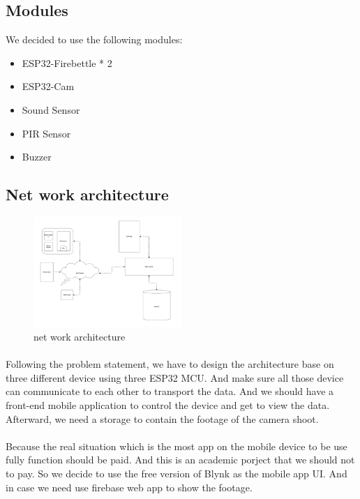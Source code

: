 \documentclass[a4paper, 12pt]{article}        %
\begin{document}
    \subsection{Modules}\label{subsec:modules}

    We decided to use the following modules:

    \begin{itemize}
        \item ESP32-Firebettle * 2
        \item ESP32-Cam
        \item Sound Sensor
        \item PIR Sensor
        \item Buzzer
    \end{itemize}

    \subsection{Net work architecture}\label{subsec:net-work-architecture}

    \begin{figure}[h]
        \centering
        \includegraphics[width=0.5\textwidth]{CircuitLayOut/img}
        \caption{net work architecture}
        \label{fig:figure1}
    \end{figure}

    \paragraph{}
    Following the problem statement, we have to design the architecture base on three different device using three ESP32 MCU\@.
    And make sure all those device can communicate to each other to transport the data.
    And we should have a front-end mobile application to control the device and get to view the data.
    Afterward, we need a storage to contain the footage of the camera shoot.

    \paragraph{}
    Because the real situation which is the most app on the mobile device to be use fully function should be paid.
    And this is an academic porject that we should not to pay. So we decide to use the free version of Blynk as the
    mobile app UI. And in case we need use firebase web app to show the footage.
\end{document}
